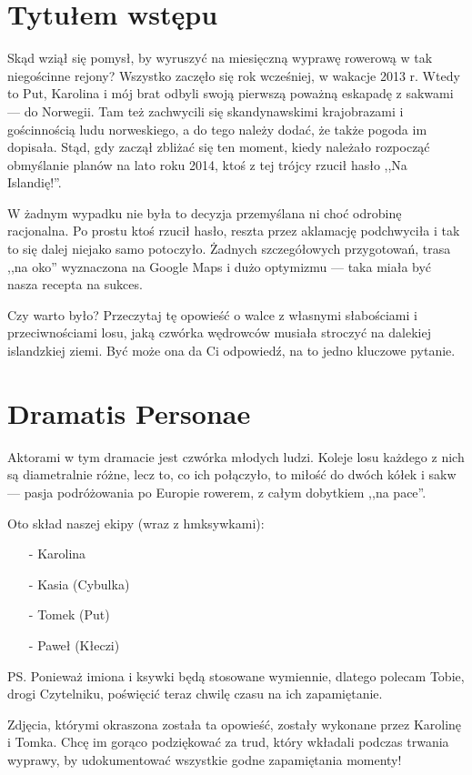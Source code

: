 \chapter*{Tytułem wstępu}

Skąd wziął się pomysł, by wyruszyć na miesięczną wyprawę rowerową w tak niegościnne rejony? Wszystko zaczęło się rok wcześniej, w wakacje 2013 r. Wtedy to Put, Karolina i mój brat odbyli swoją pierwszą poważną eskapadę z sakwami --- do Norwegii. Tam też zachwycili się skandynawskimi krajobrazami i gościnnością ludu norweskiego, a do tego należy dodać, że także pogoda im dopisała. Stąd, gdy zaczął zbliżać się ten moment, kiedy należało rozpocząć obmyślanie planów na lato roku 2014, ktoś z tej trójcy rzucił hasło ,,Na Islandię!''.

W żadnym wypadku nie była to decyzja przemyślana ni choć odrobinę racjonalna. Po prostu ktoś rzucił hasło, reszta przez aklamację podchwyciła i tak to się dalej niejako samo potoczyło. Żadnych szczegółowych przygotowań, trasa ,,na oko'' wyznaczona na Google Maps i dużo optymizmu --- taka miała być nasza recepta na sukces.

Czy warto było? Przeczytaj tę opowieść o walce z własnymi słabościami i przeciwnościami losu, jaką czwórka wędrowców musiała stroczyć na dalekiej islandzkiej ziemi. Być może ona da Ci odpowiedź, na to jedno kluczowe pytanie.

\newpage

\chapter*{Dramatis Personae}

Aktorami w tym dramacie jest czwórka młodych ludzi. Koleje losu każdego z nich są diametralnie różne, lecz to, co ich połączyło, to miłość do dwóch kółek i sakw --- pasja podróżowania po Europie rowerem, z całym dobytkiem ,,na pace''.

Oto skład naszej ekipy (wraz z hm\textellipsis ksywkami):
\begin{itemize}
	\item[-] Karolina
	\item[-] Kasia (Cybulka)
	\item[-] Tomek (Put)
	\item[-] Paweł (Kłeczi)
\end{itemize}

{\small PS. Ponieważ imiona i ksywki będą stosowane wymiennie, dlatego polecam Tobie, drogi Czytelniku, poświęcić teraz chwilę czasu na ich zapamiętanie.}


\vspace{1cm}

Zdjęcia, którymi okraszona została ta opowieść, zostały wykonane przez Karolinę i Tomka. Chcę im gorąco podziękować za trud, który wkładali podczas trwania wyprawy, by udokumentować wszystkie godne zapamiętania momenty!


